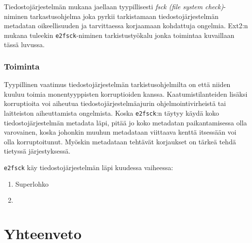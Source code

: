 Tiedostojärjestelmän mukana jaellaan tyypillisesti \emph{fsck (file system check)}-niminen tarkastusohjelma joka pyrkii tarkistamaan tiedostojärjestelmän metadatan oikeellisuuden ja tarvittaessa korjaamaan kohdattuja ongelmia.
Ext2:n mukana tuleekin \texttt{e2fsck}-niminen tarkistustyökalu jonka toimintaa kuvaillaan tässä luvussa.

\subsubsection{Toiminta}

Tyypillinen vaatimus tiedostojärjestelmän tarkistusohjelmilta on että niiden kuuluu toimia monentyyppisten korruptioiden kanssa.
Kaatumistilanteiden lisäksi korruptioita voi aiheutua tiedostojärjestelmäajurin ohjelmointivirheistä tai laitteiston aiheuttamista ongelmista.
Koska \texttt{e2fsck}:n täytyy käydä koko tiedostojärjestelmän metadata läpi,
pitää jo koko metadatan paikantamisessa olla varovainen,
koska johonkin muuhun metadataan viittaava kenttä itsessään voi olla korruptoitunut.
Myöskin metadataan tehtävät korjaukset on tärkeä tehdä tietyssä järjestyksessä.

\texttt{e2fsck} käy tiedostojärjestelmän läpi kuudessa vaiheessa:
\begin{enumerate}
    \item{Superlohko}
    \item{}
\end{enumerate}
\section{Yhteenveto}
